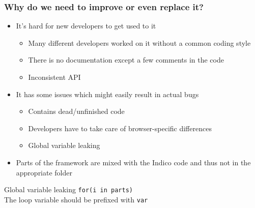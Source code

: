 \documentclass{beamer}
\begin{document}
\begin{frame}
  \frametitle{Why do we need to improve or even replace it?}
  \begin{itemize}
    \item It's hard for new developers to get used to it
      \begin{itemize}
        \item Many different developers worked on it without a common coding style
        \item There is no documentation except a few comments in the code
        \item Inconsistent API
      \end{itemize}
    \item It has some issues which might easily result in actual bugs
      \begin{itemize}
        \item Contains dead/unfinished code
        \item Developers have to take care of browser-specific differences
        \item Global variable leaking
      \end{itemize}
    \item Parts of the framework are mixed with the Indico code and thus not in the appropriate
      folder
  \end{itemize}
  \begin{alertblock}{Global variable leaking}
    \lstinline{for(i in parts)}\\
    The loop variable should be prefixed with \lstinline{var}
  \end{alertblock}
\end{frame}
\end{document}
